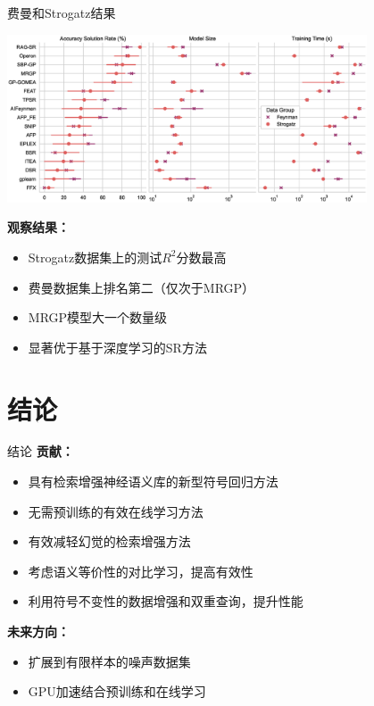 \documentclass[aspectratio=1610]{beamer}
\begin{document}
    \begin{frame}{费曼和Strogatz结果}
        \begin{center}
            \includegraphics[width=0.8\textwidth]{figs/pairgrid_accuracy_solution_rate_(pct)_model_size_training-time-(s).eps}
        \end{center}

        \textbf{观察结果：}
        \begin{itemize}
            \item Strogatz数据集上的测试$R^2$分数最高
            \item 费曼数据集上排名第二（仅次于MRGP）
            \item MRGP模型大一个数量级
            \item 显著优于基于深度学习的SR方法
        \end{itemize}
    \end{frame}


    \section{结论}

    \begin{frame}{结论}
        \textbf{贡献：}
        \begin{itemize}
            \item 具有检索增强神经语义库的新型符号回归方法
            \item 无需预训练的有效在线学习方法
            \item 有效减轻幻觉的检索增强方法
            \item 考虑语义等价性的对比学习，提高有效性
            \item 利用符号不变性的数据增强和双重查询，提升性能
        \end{itemize}

        \textbf{未来方向：}
        \begin{itemize}
            \item 扩展到有限样本的噪声数据集
            \item GPU加速结合预训练和在线学习
        \end{itemize}
    \end{frame}
\end{document}
